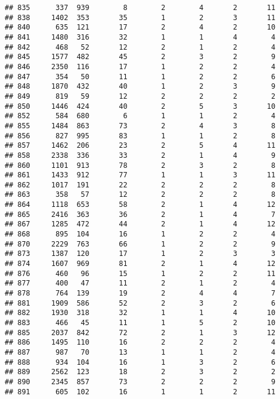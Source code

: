 \documentclass[]{article}
\begin{document}
\begin{verbatim}
## 835      337  939        8        2        4       2       11
## 838     1402  353       35        1        2       3       11
## 840      635  121       17        2        4       2       10
## 841     1480  316       32        1        1       4        4
## 842      468   52       12        2        1       2        4
## 845     1577  482       45        2        3       2        9
## 846     2350  116       17        1        2       2        4
## 847      354   50       11        1        2       2        6
## 848     1870  432       40        1        2       3        9
## 849      819   59       12        2        2       2        2
## 850     1446  424       40        2        5       3       10
## 852      584  680        6        1        1       2        4
## 855     1484  863       73        2        4       3        8
## 856      827  995       83        1        1       2        8
## 857     1462  206       23        2        5       4       11
## 858     2338  336       33        2        1       4        9
## 860     1101  913       78        2        3       2        8
## 861     1433  912       77        1        1       3       11
## 862     1017  191       22        2        2       2        8
## 863      358   57       12        2        2       2        8
## 864     1118  653       58        2        1       4       12
## 865     2416  363       36        2        1       4        7
## 867     1285  472       44        2        1       4       12
## 868      895  104       16        1        2       2        4
## 870     2229  763       66        1        2       2        9
## 873     1387  120       17        1        2       3        3
## 874     1607  969       81        2        1       4       12
## 876      460   96       15        1        2       2       11
## 877      400   47       11        2        1       2        4
## 878      764  139       19        2        4       4        7
## 881     1909  586       52        2        3       2        6
## 882     1930  318       32        1        1       4       10
## 883      466   45       11        1        5       2       10
## 885     2037  842       72        2        1       3       12
## 886     1495  110       16        2        2       2        4
## 887      987   70       13        1        1       2        4
## 888      934  104       16        1        3       2        6
## 889     2562  123       18        2        3       2        2
## 890     2345  857       73        2        2       2        9
## 891      605  102       16        1        1       2       11

\end{verbatim}
\end{document}
